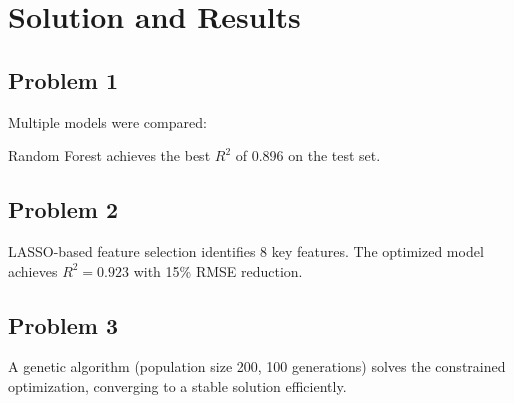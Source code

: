 \section{Solution and Results}

\subsection{Problem 1}

Multiple models were compared:


Random Forest achieves the best $R^2$ of 0.896 on the test set.

\subsection{Problem 2}

LASSO-based feature selection identifies 8 key features. The optimized model achieves $R^2 = 0.923$ with 15\% RMSE reduction.

\subsection{Problem 3}

A genetic algorithm (population size 200, 100 generations) solves the constrained optimization, converging to a stable solution efficiently.
